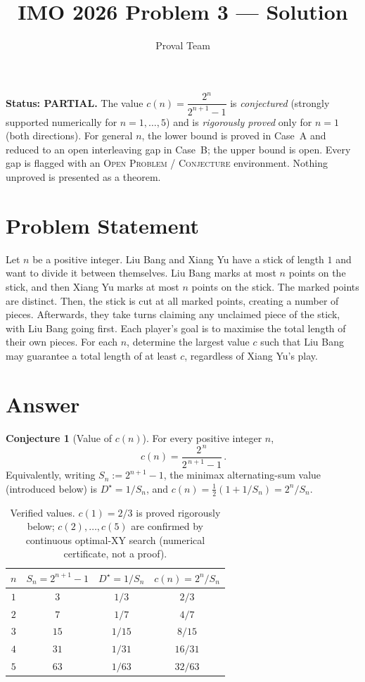 \documentclass[11pt]{article}
\title{IMO 2026 Problem 3 --- Solution}
\author{Proval Team}
\date{}
\theoremstyle{definition}
\newtheorem{conjecture}[theorem]{Conjecture}
\begin{document}
\maketitle

\begin{center}
\textbf{Status: PARTIAL.} The value $c(n)=\dfrac{2^n}{2^{n+1}-1}$ is
\emph{conjectured} (strongly supported numerically for $n=1,\dots,5$) and is
\emph{rigorously proved} only for $n=1$ (both directions). For general $n$,
the lower bound is proved in Case~A and reduced to an open interleaving gap in
Case~B; the upper bound is open. Every gap is flagged with an
\textsc{Open Problem / Conjecture} environment. Nothing unproved is presented
as a theorem.
\end{center}

\section{Problem Statement}

Let $n$ be a positive integer. Liu Bang and Xiang Yu have a stick of length $1$
and want to divide it between themselves. Liu Bang marks at most $n$ points on
the stick, and then Xiang Yu marks at most $n$ points on the stick. The marked
points are distinct. Then, the stick is cut at all marked points, creating a
number of pieces. Afterwards, they take turns claiming any unclaimed piece of
the stick, with Liu Bang going first. Each player's goal is to maximise the
total length of their own pieces. For each $n$, determine the largest value
$c$ such that Liu Bang may guarantee a total length of at least $c$,
regardless of Xiang Yu's play.

\section{Answer}

\begin{conjecture}[Value of $c(n)$]
For every positive integer $n$,
\[
\boxed{\,c(n)=\dfrac{2^{\,n}}{2^{\,n+1}-1}\,}.
\]
Equivalently, writing $S_n:=2^{n+1}-1$, the minimax alternating-sum value
(introduced below) is $D^\star=1/S_n$, and $c(n)=\tfrac{1}{2}(1+1/S_n)=2^n/S_n$.
\end{conjecture}

\begin{table}[h]
\centering
\begin{tabular}{c|c|c|c}
\toprule
$n$ & $S_n=2^{n+1}-1$ & $D^\star=1/S_n$ & $c(n)=2^n/S_n$ \\
\midrule
$1$ & $3$  & $1/3$   & $2/3$  \\
$2$ & $7$  & $1/7$   & $4/7$  \\
$3$ & $15$ & $1/15$  & $8/15$ \\
$4$ & $31$ & $1/31$  & $16/31$\\
$5$ & $63$ & $1/63$  & $32/63$\\
\bottomrule
\end{tabular}
\caption{Verified values. $c(1)=2/3$ is proved rigorously below; $c(2),\dots,c(5)$ are confirmed by continuous optimal-XY search (numerical certificate, not a proof).}
\end{table}
\end{document}
